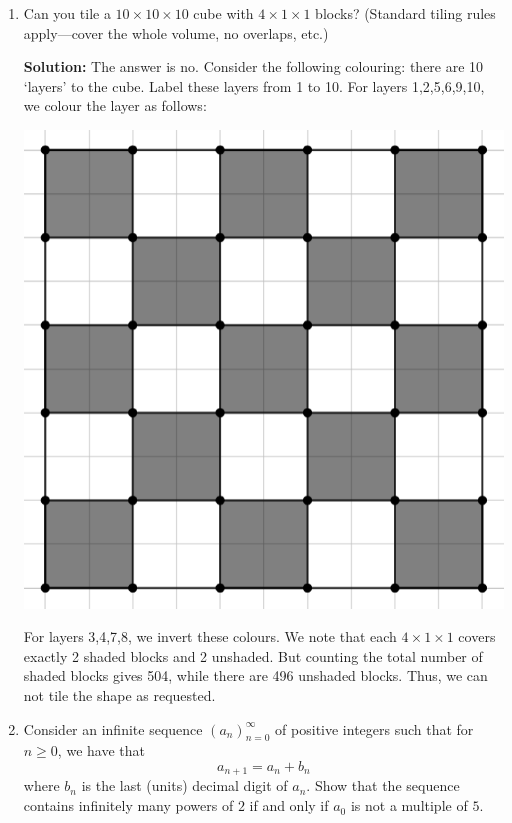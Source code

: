 \documentclass{article}
\begin{document}
\begin{enumerate}[itemsep=24pt]
\item %
Can you tile a $10\times 10\times 10$ cube with $4\times 1\times 1$ blocks? (Standard tiling rules apply---cover the whole volume, no overlaps, etc.)

\textbf{Solution:}
The answer is no. Consider the following colouring: there are 10 `layers' to the cube. Label these layers from 1 to 10. For layers 1,2,5,6,9,10, we colour the layer as follows:
\begin{center}
\includegraphics[scale=0.5]{Capture.png}
\end{center}
For layers 3,4,7,8, we invert these colours.
We note that each $4\times 1\times 1$ covers exactly 2 shaded blocks and 2 unshaded.
But counting the total number of shaded blocks gives 504, while there are 496 unshaded blocks.
Thus, we can not tile the shape as requested. 


\item %
Consider an infinite sequence $(a_n)_{n=0}^{\infty}$ of positive integers such that for $n \geq 0$, we have that
\[
    a_{n + 1} = a_n + b_n
\]
where $b_n$ is the last (units) decimal digit of $a_n$. Show that the sequence contains infinitely many powers of $2$ if and only if $a_0$ is not a multiple of $5$.


\end{enumerate}
\end{document}
